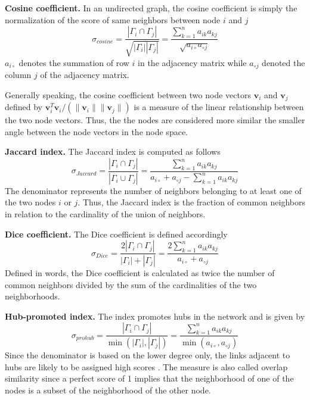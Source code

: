 \textbf{Cosine coefficient.} In an undirected graph, the cosine coefficient is simply the normalization of the score of same neighbors between node $i$ and $j$ \cite{fouss2016algorithms}
\begin{equation}
    \label{cosine}
    \sigma_{cosine} = \frac{|\Gamma_i \cap \Gamma_j|}{\sqrt{|\Gamma_i||\Gamma_j|}} = \frac{\sum_{k=1}^n a_{ik}a_{kj}}{\sqrt{a_{i \circ }a_{\circ j}}}
\end{equation}
$a_{i \circ }$ denotes the summation of row $i$ in the adjacency matrix while $a_{\circ j}$ denoted the column $j$ of the adjacency matrix.

Generally speaking, the cosine coefficient between two node vectors $\textbf{v}_i$ and $\textbf{v}_j$ defined by $\textbf{v}_i^T\textbf{v}_i/(\|\textbf{v}_i\|\|\textbf{v}_j\|)$ is a measure of the linear relationship between the two node vectors. Thus, the the nodes are considered more similar the smaller angle between the node vectors in the node space.

\textbf{Jaccard index.} The Jaccard index is computed as follows
\begin{equation}
    \label{jaccard}
    \sigma_{Jaccard} = \frac{|\Gamma_i \cap \Gamma_j|}{|\Gamma_i \cup \Gamma_j|} = \frac{\sum_{k=1}^n a_{ik}a_{kj}}{a_{i \circ }+a_{\circ j}-\sum_{k=1}^n a_{ik}a_{kj}}
\end{equation}
The denominator represents the number of neighbors belonging to at least one of the two nodes $i$ or $j$. Thus, the Jaccard index is the fraction of common neighbors in relation to the cardinality of the union of neighbors. 

\textbf{Dice coefficient.} The Dice coefficient is defined accordingly
\begin{equation}
    \label{dice}
    \sigma_{Dice} = \frac{2 |\Gamma_i \cap \Gamma_j|}{|\Gamma_i|+|\Gamma_j|}= \frac{2\sum_{k=1}^n a_{ik}a_{kj}}{a_{i \circ }+a_{\circ j}}
\end{equation}
Defined in words, the Dice coefficient is calculated as twice the number of common neighbors divided by the sum of the cardinalities of the two neighborhoods. 

\textbf{Hub-promoted index.} The index promotes hubs in the network and is given by
\begin{equation}
    \label{prohub}
    \sigma_{prohub} = \frac{|\Gamma_i \cap \Gamma_j|}{\min(|\Gamma_i|,|\Gamma_j|)} = \frac{\sum_{k=1}^n a_{ik}a_{kj}}{\min(a_{i \circ },a_{\circ j})}
\end{equation}
Since the denominator is based on the lower degree only, the links adjacent to hubs are likely to be assigned high scores \citep{lu2011}. The measure is also called overlap similarity \citep{fouss2016algorithms} since a perfect score of 1 implies that the neighborhood of one of the nodes is a subset of the neighborhood of the other node.

